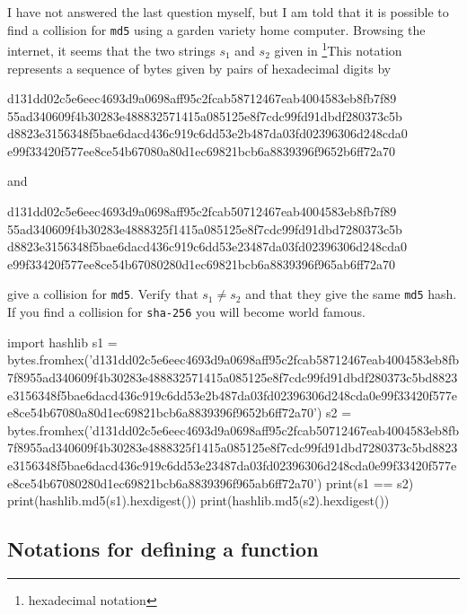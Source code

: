 \documentclass{article}
\begin{document}
\begin{hint}[showhide]
  I have not answered the last question myself, but I am told that it is possible to find
  a collision for \texttt{md5} using a garden variety home computer. Browsing the internet, it
  seems that the two strings $s_1$ and $s_2$ given in \footnote{hexadecimal notation}{This notation represents a sequence of bytes given by pairs of hexadecimal digits} by
\begin{code}
d131dd02c5e6eec4693d9a0698aff95c2fcab58712467eab4004583eb8fb7f89 
55ad340609f4b30283e488832571415a085125e8f7cdc99fd91dbdf280373c5b 
d8823e3156348f5bae6dacd436c919c6dd53e2b487da03fd02396306d248cda0 
e99f33420f577ee8ce54b67080a80d1ec69821bcb6a8839396f9652b6ff72a70
\end{code}
and
\begin{code}
d131dd02c5e6eec4693d9a0698aff95c2fcab50712467eab4004583eb8fb7f89 
55ad340609f4b30283e4888325f1415a085125e8f7cdc99fd91dbd7280373c5b 
d8823e3156348f5bae6dacd436c919c6dd53e23487da03fd02396306d248cda0 
e99f33420f577ee8ce54b67080280d1ec69821bcb6a8839396f965ab6ff72a70 
\end{code}
give a collision for \texttt{md5}. Verify that $s_1\neq s_2$ and
that they give the same \texttt{md5} hash. If you find a collision
for \texttt{sha-256} you will
become world famous.

\begin{hint}[showhide]
\begin{sage}
import hashlib
s1 = bytes.fromhex('d131dd02c5e6eec4693d9a0698aff95c2fcab58712467eab4004583eb8fb7f8955ad340609f4b30283e488832571415a085125e8f7cdc99fd91dbdf280373c5bd8823e3156348f5bae6dacd436c919c6dd53e2b487da03fd02396306d248cda0e99f33420f577ee8ce54b67080a80d1ec69821bcb6a8839396f9652b6ff72a70')
s2 = bytes.fromhex('d131dd02c5e6eec4693d9a0698aff95c2fcab50712467eab4004583eb8fb7f8955ad340609f4b30283e4888325f1415a085125e8f7cdc99fd91dbd7280373c5bd8823e3156348f5bae6dacd436c919c6dd53e23487da03fd02396306d248cda0e99f33420f577ee8ce54b67080280d1ec69821bcb6a8839396f965ab6ff72a70')
print(s1 == s2)
print(hashlib.md5(s1).hexdigest())
print(hashlib.md5(s2).hexdigest())
\end{sage}
\end{hint}
\end{hint}
\endshex

\subsection{Notations for defining a function}
\end{document}
